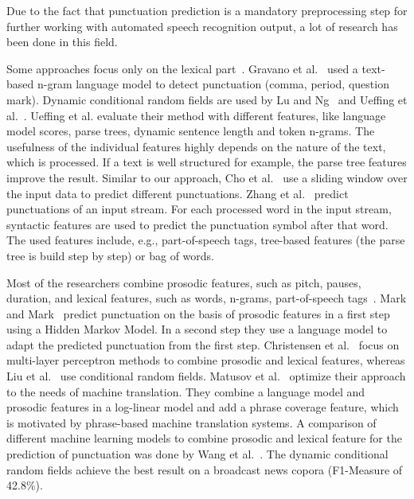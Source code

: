 Due to the fact that punctuation prediction is a mandatory preprocessing step for further working with automated speech recognition output, a lot of research has been done in this field.

Some approaches focus only on the lexical part~\cite{Gravano2009, Lu2010, Ueffing2013, Cho2012, Zhang2013}.
Gravano et al.~\cite{Gravano2009} used a text-based n-gram language model to detect punctuation (comma, period, question mark).
Dynamic conditional random fields are used by Lu and Ng~\cite{Lu2010} and Ueffing et al.~\cite{Ueffing2013}.
Ueffing et al. evaluate their method with different features, like language model scores, parse trees, dynamic sentence length and token n-grams.
The usefulness of the individual features highly depends on the nature of the text, which is processed.
If a text is well structured for example, the parse tree features improve the result.
Similar to our approach, Cho et al.~\cite{Cho2012} use a sliding window over the input data to predict different punctuations.
Zhang et al.~\cite{Zhang2013} predict punctuations of an input stream.
For each processed word in the input stream, syntactic features are used to predict the punctuation symbol after that word.
The used features include, e.g., part-of-speech tags, tree-based features (the parse tree is build step by step) or bag of words.

Most of the researchers combine prosodic features, such as pitch, pauses, duration, and lexical features, such as words, n-grams, part-of-speech tags~\cite{Mark1999, Christensen2001, Liu2005, Matusov2007, Wang2012}.
Mark and Mark~\cite{Mark1999} predict punctuation on the basis of prosodic features in a first step using a Hidden Markov Model.
In a second step they use a language model to adapt the predicted punctuation from the first step.
Christensen et al.~\cite{Christensen2001} focus on multi-layer perceptron methods to combine prosodic and lexical features, whereas Liu et al.~\cite{Liu2005} use conditional random fields.
Matusov et al.~\cite{Matusov2007} optimize their approach to the needs of machine translation.
They combine a language model and prosodic features in a log-linear model and add a phrase coverage feature, which is motivated by phrase-based machine translation systems.
A comparison of different machine learning models to combine prosodic and lexical feature for the prediction of punctuation was done by Wang et al.~\cite{Wang2012}.
The dynamic conditional random fields achieve the best result on a broadcast news copora (F1-Measure of 42.8\%).

